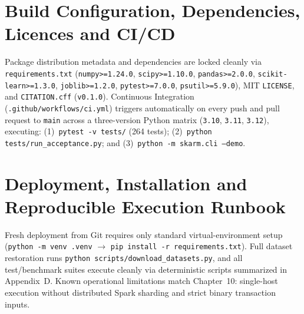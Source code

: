 \section{Build Configuration, Dependencies, Licences and CI/CD}
Package distribution metadata and dependencies are locked cleanly via \texttt{requirements.txt} (\texttt{numpy>=1.24.0}, \texttt{scipy>=1.10.0}, \texttt{pandas>=2.0.0}, \texttt{scikit-learn>=1.3.0}, \texttt{joblib>=1.2.0}, \texttt{pytest>=7.0.0}, \texttt{psutil>=5.9.0}), MIT \texttt{LICENSE}, and \texttt{CITATION.cff} (\texttt{v0.1.0}). Continuous Integration (\texttt{.github/\protect\allowbreak{}workflows/\protect\allowbreak{}ci.yml}) triggers automatically on every push and pull request to \texttt{main} across a three-version Python matrix (\texttt{3.10}, \texttt{3.11}, \texttt{3.12}), executing: (1)~\texttt{pytest -v tests/\protect\allowbreak{}} (264 tests); (2)~\texttt{python tests/run\_\protect\allowbreak{}acceptance.py}; and (3)~\texttt{python -m skarm.cli --demo}.

\section{Deployment, Installation and Reproducible Execution Runbook}
Fresh deployment from Git requires only standard virtual-environment setup (\texttt{python -m venv .venv} $\to$ \texttt{pip install -r requirements.txt}). Full dataset restoration runs \texttt{python scripts/download\_\protect\allowbreak{}datasets.py}, and all test/benchmark suites execute cleanly via deterministic scripts summarized in Appendix~D. Known operational limitations match Chapter~10: single-host execution without distributed Spark sharding and strict binary transaction inputs.
